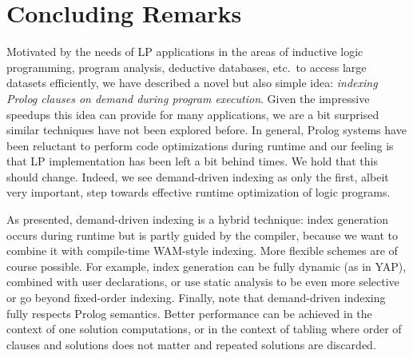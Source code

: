 \documentclass{llncs}
\newcommand{\JITI}{demand-driven indexing\xspace}
\begin{document}
\section{Concluding Remarks}
Motivated by the needs of LP applications in the areas of inductive
logic programming, program analysis, deductive databases, etc.\ to
access large datasets efficiently, we have described a novel but also
simple idea: \emph{indexing Prolog clauses on demand during program
execution}.
%
Given the impressive speedups this idea can provide for many
applications, we are a bit surprised similar techniques have not been
explored before. In general, Prolog systems have been reluctant to
perform code optimizations during runtime and our feeling is that LP
implementation has been left a bit behind times. We hold that this
should change.
%
Indeed, we see \JITI as only the first, albeit very important, step
towards effective runtime optimization of logic programs.

As presented, \JITI is a hybrid technique: index generation occurs
during runtime but is partly guided by the compiler, because we want
to combine it with compile-time WAM-style indexing. More flexible
schemes are of course possible. For example, index generation can be
fully dynamic (as in YAP), combined with user declarations, or use
static analysis to be even more selective or go beyond fixed-order
indexing.
%
Finally, note that \JITI fully respects Prolog semantics. Better
performance can be achieved in the context of one solution
computations, or in the context of tabling where order of clauses and
solutions does not matter and repeated solutions are discarded.




\end{document}
